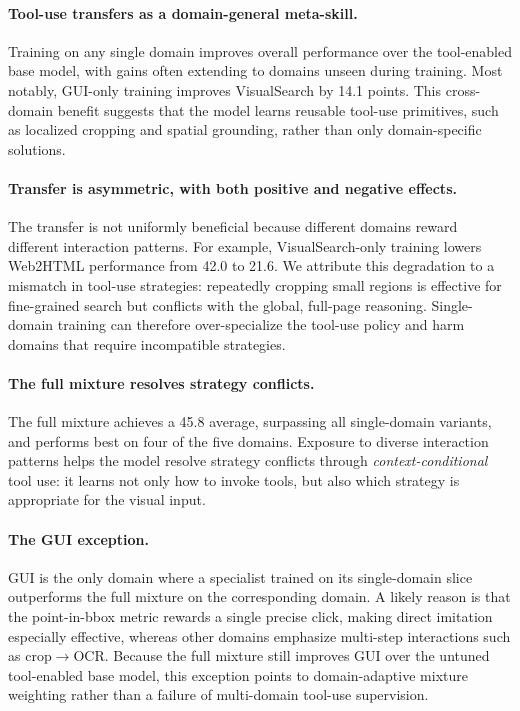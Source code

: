 \paragraph{Tool-use transfers as a domain-general meta-skill.}
Training on any single domain improves overall performance over the tool-enabled base model, with gains often extending to domains unseen during training. Most notably, GUI-only training improves VisualSearch by 14.1 points. This cross-domain benefit suggests that the model learns reusable tool-use primitives, such as localized cropping and spatial grounding, rather than only domain-specific solutions.

\paragraph{Transfer is asymmetric, with both positive and negative effects.}
The transfer is not uniformly beneficial because different domains reward different interaction patterns. For example, VisualSearch-only training lowers Web2HTML performance from 42.0 to 21.6. We attribute this degradation to a mismatch in tool-use strategies: repeatedly cropping small regions is effective for fine-grained search but conflicts with the global, full-page reasoning. Single-domain training can therefore over-specialize the tool-use policy and harm domains that require incompatible strategies.

\paragraph{The full mixture resolves strategy conflicts.}
The full \dataset{} mixture achieves a 45.8 average, surpassing all single-domain variants, and performs best on four of the five domains. Exposure to diverse interaction patterns helps the model resolve strategy conflicts through \emph{context-conditional} tool use: it learns not only how to invoke tools, but also which strategy is appropriate for the visual input.

\paragraph{The GUI exception.}
GUI is the only domain where a specialist trained on its single-domain slice outperforms the full mixture on the corresponding domain. A likely reason is that the point-in-bbox metric rewards a single precise click, making direct imitation especially effective, whereas other domains emphasize multi-step interactions such as crop$\to$OCR. Because the full mixture still improves GUI over the untuned tool-enabled base model, this exception points to domain-adaptive mixture weighting rather than a failure of multi-domain tool-use supervision.
